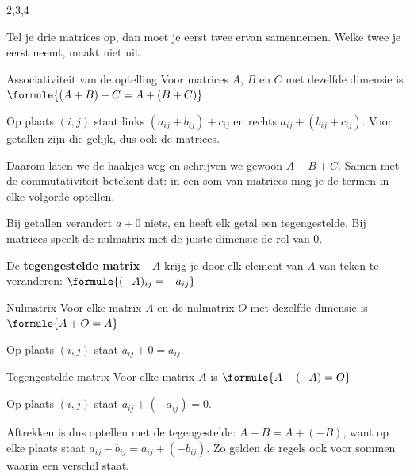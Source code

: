 \begin{alleenvoor}{2,3,4}

Tel je drie matrices op, dan moet je eerst twee ervan samennemen. Welke twee je eerst neemt, maakt niet uit.

\begin{theorie}
\begin{stelling}{Associativiteit van de optelling}
Voor matrices $A$, $B$ en $C$ met dezelfde dimensie is \qquad $\formule{(A + B) + C = A + (B + C)}$
\end{stelling}

\begin{bewijs}
Op plaats $(i, j)$ staat links $(a_{ij} + b_{ij}) + c_{ij}$ en rechts $a_{ij} + (b_{ij} + c_{ij})$. Voor getallen zijn die gelijk, dus ook de matrices.
\end{bewijs}
\end{theorie}

Daarom laten we de haakjes weg en schrijven we gewoon $A + B + C$. Samen met de commutativiteit betekent dat: in een som van matrices mag je de termen in elke volgorde optellen.

Bij getallen verandert $a + 0$ niets, en heeft elk getal een tegengestelde. Bij matrices speelt de nulmatrix met de juiste dimensie de rol van 0.

\begin{theorie}
De \textbf{\textcolor{accent}{tegengestelde matrix}} $-A$ krijg je door elk element van $A$ van teken te veranderen: \quad $\formule{(-A)_{ij} = -a_{ij}}$

\begin{stelling}{Nulmatrix}
Voor elke matrix $A$ en de nulmatrix $O$ met dezelfde dimensie is \qquad $\formule{A + O = A}$
\end{stelling}

\begin{bewijs}
Op plaats $(i, j)$ staat $a_{ij} + 0 = a_{ij}$.
\end{bewijs}

\begin{stelling}{Tegengestelde matrix}
Voor elke matrix $A$ is \qquad $\formule{A + (-A) = O}$
\end{stelling}

\begin{bewijs}
Op plaats $(i, j)$ staat $a_{ij} + (-a_{ij}) = 0$.
\end{bewijs}
\end{theorie}

Aftrekken is dus optellen met de tegengestelde: $A - B = A + (-B)$, want op elke plaats staat $a_{ij} - b_{ij} = a_{ij} + (-b_{ij})$. Zo gelden de regels ook voor sommen waarin een verschil staat.


\end{alleenvoor}
